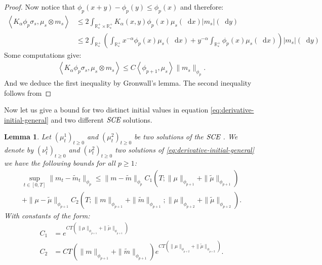 \documentclass[11pt,a4paper]{article}
\newcommand{\RRP}{\mathbb{R}^+_*}
\newcommand{\SCE}{\emph{SCE}}
\newcommand{\Proc}[1]{\left(#1\right)_{t\geq 0}}
\newcommand{\brac}[1]{\left\langle#1\right\rangle}
\newcommand{\dd}{\mathop{}\!\mathrm{d}}
\newtheorem{lemma}[theorem]{Lemma}
\begin{document}
\begin{proof}
    Now notice that $\phi_p(x+y) - \phi_p(y) \leq \phi_p(x)$ and therefore:
    \begin{align*}
        \brac{K_\alpha \phi_p\sigma_s, \mu_s\otimes m_s} 
        &\leq 2\int_{\RRP\times\RRP} K_\alpha(x,y) \phi_p(x)\mu_s(\dd x)|m_s|(\dd y)\\
        &\leq 2\int_{\RRP} \left(\int_{\RRP}x^{-\alpha}\phi_p(x)\mu_s(\dd x) + y^{-\alpha} \int_{\RRP}\phi_p(x)\mu_s(\dd x)\right) |m_s|(\dd y)
    \end{align*}
    Some computations give:
    \begin{align*}
        \brac{K_\alpha \phi_p\sigma_s, \mu_s\otimes m_s}  \leq C\brac{\phi_{p+1},\mu_s} \| m_s\|_{\phi_p}.
    \end{align*}
    And we deduce the first inequality by Gronwall's lemma. The second inequality follows from 
\end{proof}
Now let us give a bound for two distinct initial values in equation \eqref{eq:derivative-initial-general} and two different $\SCE$ solutions.
\begin{lemma}\label{lem:pseudo-lip-derivative-eq}
     Let $\Proc{\mu^1_t}$ and $\Proc{\mu^2_t}$ be two solutions of the $\SCE$ . We denote by $\Proc{\nu^1_t}$ and $\Proc{\nu^2_t}$ two solutions of \eqref{eq:derivative-initial-general} we have the following bounds for all $p \geq 1$:
    \begin{multline*}
        \sup\limits_{t \in [0,T]} \| m_t - \tilde{m}_t \|_{\phi_p} \leq \|m- \tilde{m} \|_{\phi_{p}} C_1\left(T;\| \mu\|_{\phi_{p+1}} + \| \tilde{\mu}\|_{\phi_{p+1}}\right)\\
        + \|\mu - \tilde{\mu} \|_{\phi_{p+1}}C_2\left(T; \|m\|_{\phi_{p+1}}+ \|\tilde{m}\|_{\phi_{p+1}};\|\mu\|_{\phi_{p +2}} + \|\tilde{\mu}\|_{\phi_{p +2}}\right).
    \end{multline*}
    With constants of the form:
    \begin{align*}
        C_1 &= e^{CT\left(\| \mu\|_{\phi_{p+1}} + \|\tilde{ \mu}\|_{\phi_{p+1}}\right)}\\
        C_2 &= CT(\|m\|_{\phi_{p+1}}+ \|\tilde{m}\|_{\phi_{p+1}})e^{CT\left(\| \mu\|_{\phi_{p+2}} + \|\tilde{ \mu}\|_{\phi_{p+2}}\right)}.
    \end{align*}
\end{lemma}
\end{document}
